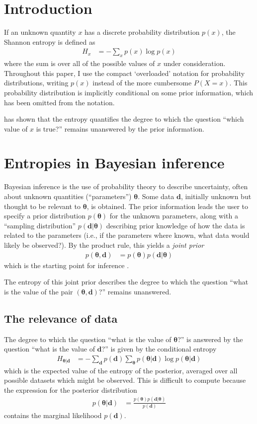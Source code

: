 \documentclass[entropy,article,submit,oneauthor,pdftex,10pt,a4paper]{mdpi}
\renewcommand{\d}{\boldsymbol{d}}
\newcommand{\x}{\boldsymbol{\theta}}
\begin{document}

\section{Introduction}
\noindent
If an unknown quantity $x$ has a discrete probability distribution $p(x)$,
the Shannon entropy \citep{shannon} is defined as
\begin{align}
H_{x} &= -\sum_{x} p(x) \log p(x)
\end{align}
where the sum is over all of the possible values of $x$ under consideration.
Throughout this paper, I use the compact
`overloaded' notation for probability distributions, writing $p(x)$ instead
of the more cumbersome $P(X=x)$.
This probability distribution is implicitly conditional on some prior
information, which has been omitted from the notation.

\citet{knuth} has shown that the entropy quantifies the degree to which the
question ``which value of $x$ is true?'' remains unanswered by the prior
information.

\section{Entropies in Bayesian inference}

Bayesian inference is the use of probability theory to
describe uncertainty, often about unknown quantities
(``parameters'') $\x$. Some data $\d$, initially unknown but
thought to be relevant to $\x$, is obtained.
The prior information leads the
user to specify a prior distribution $p(\x)$ for the unknown parameters,
along with a ``sampling distribution'' $p(\d | \x)$ describing prior knowledge
of how the data is related to the parameters
(i.e., if the parameters where known, what data would likely be observed?). By the product rule, this yields a {\em joint prior}
\begin{align}
p(\x, \d) &= p(\x)p(\d | \x)
\end{align}
which is the starting point for inference \citep{caticha}.

The entropy of this joint prior describes the degree to which the question
``what is the value of the pair $(\x, \d)$?'' remains unanswered.

\subsection{The relevance of data}
The degree to which the question ``what is the value of $\x$?'' is
answered by the question ``what is the value of $\d$?'' is given by the
conditional entropy
\begin{align}
H_{\x | \d} &= - \sum_{\d} p(\d) \sum_{\x} p(\x | \d) \log p(\x | \d)
\end{align}
which is the expected value of the entropy of the posterior, averaged over
all possible datasets which might be observed.
This is difficult to compute because the expression
for the posterior distribution
\begin{align}
p(\x | \d) &= \frac{p(\x)p(\d | \x)}{p(\d)}
\end{align}
contains the marginal likelihood $p(\d)$.
\end{document}
